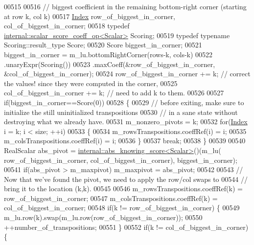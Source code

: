 \begin{DoxyCode}
00515 
00516     \textcolor{comment}{// biggest coefficient in the remaining bottom-right corner (starting at row k, col k)}
00517     \hyperlink{group___core___module_a554f30542cc2316add4b1ea0a492ff02}{Index} row\_of\_biggest\_in\_corner, col\_of\_biggest\_in\_corner;
00518     \textcolor{keyword}{typedef} \hyperlink{struct_eigen_1_1internal_1_1scalar__score__coeff__op}{internal::scalar\_score\_coeff\_op<Scalar>} Scoring;
00519     \textcolor{keyword}{typedef} \textcolor{keyword}{typename} Scoring::result\_type Score;
00520     Score biggest\_in\_corner;
00521     biggest\_in\_corner = m\_lu.bottomRightCorner(rows-k, cols-k)
00522                         .unaryExpr(Scoring())
00523                         .maxCoeff(&row\_of\_biggest\_in\_corner, &col\_of\_biggest\_in\_corner);
00524     row\_of\_biggest\_in\_corner += k; \textcolor{comment}{// correct the values! since they were computed in the corner,}
00525     col\_of\_biggest\_in\_corner += k; \textcolor{comment}{// need to add k to them.}
00526 
00527     \textcolor{keywordflow}{if}(biggest\_in\_corner==Score(0))
00528     \{
00529       \textcolor{comment}{// before exiting, make sure to initialize the still uninitialized transpositions}
00530       \textcolor{comment}{// in a sane state without destroying what we already have.}
00531       m\_nonzero\_pivots = k;
00532       \textcolor{keywordflow}{for}(\hyperlink{group___core___module_a554f30542cc2316add4b1ea0a492ff02}{Index} i = k; i < size; ++i)
00533       \{
00534         m\_rowsTranspositions.coeffRef(i) = i;
00535         m\_colsTranspositions.coeffRef(i) = i;
00536       \}
00537       \textcolor{keywordflow}{break};
00538     \}
00539 
00540     RealScalar abs\_pivot = \hyperlink{struct_eigen_1_1internal_1_1abs__knowing__score}{internal::abs\_knowing\_score<Scalar>}()(m\_lu(
      row\_of\_biggest\_in\_corner, col\_of\_biggest\_in\_corner), biggest\_in\_corner);
00541     \textcolor{keywordflow}{if}(abs\_pivot > m\_maxpivot) m\_maxpivot = abs\_pivot;
00542 
00543     \textcolor{comment}{// Now that we've found the pivot, we need to apply the row/col swaps to}
00544     \textcolor{comment}{// bring it to the location (k,k).}
00545 
00546     m\_rowsTranspositions.coeffRef(k) = row\_of\_biggest\_in\_corner;
00547     m\_colsTranspositions.coeffRef(k) = col\_of\_biggest\_in\_corner;
00548     \textcolor{keywordflow}{if}(k != row\_of\_biggest\_in\_corner) \{
00549       m\_lu.row(k).swap(m\_lu.row(row\_of\_biggest\_in\_corner));
00550       ++number\_of\_transpositions;
00551     \}
00552     \textcolor{keywordflow}{if}(k != col\_of\_biggest\_in\_corner) \{

\end{DoxyCode}
